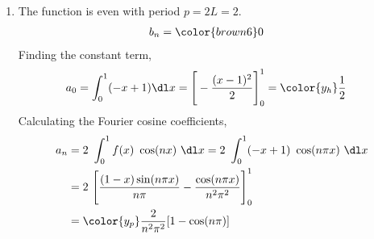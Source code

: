 \begin{enumerate}
    \item The function is even with period $ p = 2L = 2 $.
          \begin{align}
              b_n & = \color{brown6} 0
          \end{align}
          Finding the constant term,
          \begin{align}
              a_0 & = \int_{0}^{1} (-x + 1) \dl x
              = \Bigg[ -\frac{(x-1)^2}{2} \Bigg]_0^1 = \color{y_h} \frac{1}{2}
          \end{align}
          Calculating the Fourier cosine coefficients,
          \begin{align}
              a_n & = 2\ \int_{0}^{1} f(x)\ \cos(nx)\ \dl x
              = 2\ \int_{0}^{1} (-x + 1)\ \cos(n\pi x)\ \dl x          \\
                  & = 2\ \Bigg[ \frac{(1 - x) \sin(n\pi x)}{n\pi}
              - \frac{\cos(n\pi x)}{n^2 \pi^2}  \Bigg]_{0}^{1}         \\
                  & = \color{y_p} \frac{2}{n^2 \pi^2} [1 - \cos(n\pi)]
          \end{align}


\end{enumerate}
